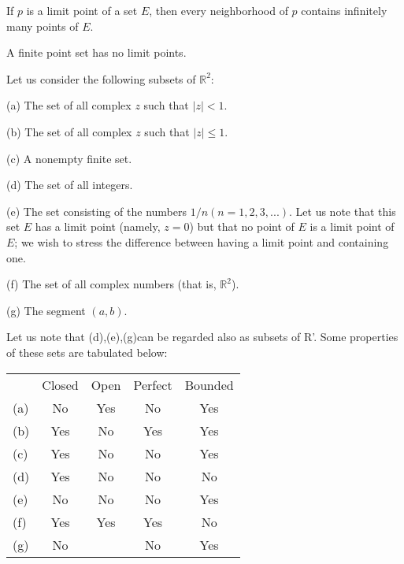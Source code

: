 \begin{thm}
    \label{thm:2.20}
    If $p$ is a limit point of a set $E$, then every neighborhood of $p$ contains infinitely many points of $E$.
\end{thm}

\begin{myCorollary}
    A finite point set has no limit points.
\end{myCorollary}

\begin{myExample}
    \label{myExample:2.21}
    Let us consider the following subsets of $\mathbb{R}^2$:

(a) The set of all complex $z$ such that $|z| < 1$.

(b) The set of all complex $z$ such that $|z| \leq 1$.

(c) A nonempty finite set.

(d) The set of all integers.

(e) The set consisting of the numbers $1/n(n=1,2,3,...)$. Let us note that this set $E$ has a limit point (namely, $z =0$) but that no point of $E$ is a limit point of $E$; we wish to stress the difference between having a limit point and containing one.

(f) The set of all complex numbers (that is, $\mathbb{R}^2$).

(g) The segment $(a,b)$.
\end{myExample}

Let us note that (d),(e),(g)can be regarded also as subsets of R'.
Some properties of these sets are tabulated below:


\begin{table}[htbp]
    \begin{center}
    \begin{tabular}{lcccc}
        & Closed & Open & Perfect & Bounded \\
    (a) & No     & Yes  & No      & Yes     \\
    (b) & Yes    & No   & Yes     & Yes     \\
    (c) & Yes    & No   & No      & Yes     \\
    (d) & Yes    & No   & No      & No      \\
    (e) & No     & No   & No      & Yes     \\
    (f) & Yes    & Yes  & Yes     & No      \\
    (g) & No     &      & No      & Yes    
    \end{tabular}
    \end{center}
\end{table}

